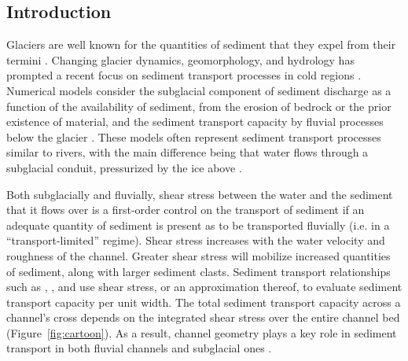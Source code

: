 \documentclass[11pt]{article}
\begin{document}
        
        \begin{spacing}{1}
          \section{Introduction}
           
          Glaciers are well known for the quantities of sediment that they expel from their termini \citep{hallet1996}.
          Changing glacier dynamics, geomorphology, and hydrology  has prompted a recent focus on  sediment transport processes in cold regions \citep[e.g.][]{zhang2022}.          
          Numerical models consider the subglacial component of sediment discharge as a function of the availability of sediment, from the erosion of bedrock or the prior existence of material, and the sediment transport capacity by fluvial processes below the glacier \citep{creyts2013,brinkerhoff2017,beaud2018,delaney2019}.
          These models often represent sediment transport processes similar to rivers, with the main difference being that water flows through a subglacial conduit, pressurized by the ice above \citep{rothlisberger1972}.

          Both subglacially and fluvially, shear stress between the water and the sediment that it flows over is a first-order control on the transport of sediment \citep{shields1936} if an adequate quantity of sediment is present as to be transported fluvially (i.e. in a ``transport-limited'' regime). 
          Shear stress increases with the water velocity and roughness of the channel.
          Greater shear stress will mobilize increased quantities of sediment, along with larger sediment clasts.
          Sediment transport relationships such as \citet{shields1936}, \citet{meyer1948},  and \citet{engelund1967} use shear stress, or an approximation thereof, to evaluate sediment transport capacity per unit width.
          The total sediment transport capacity across a channel's cross depends on the integrated shear stress over the entire channel bed (Figure~\ref{fig:cartoon}).
          As a result, channel geometry plays a key role in sediment transport in both fluvial channels and subglacial ones \citep[e.g.][]{church2006,delaney2019}.
          

\end{spacing}
\end{document}
